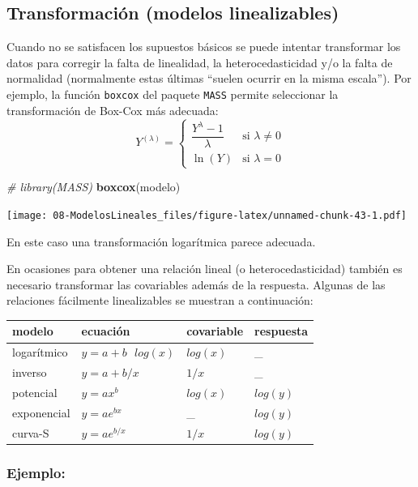 \documentclass[]{book}
\newenvironment{Shaded}{\begin{snugshade}}{\end{snugshade}}
\newcommand{\KeywordTok}[1]{\textcolor[rgb]{0.13,0.29,0.53}{\textbf{#1}}}
\newcommand{\CommentTok}[1]{\textcolor[rgb]{0.56,0.35,0.01}{\textit{#1}}}
\newcommand{\NormalTok}[1]{#1}
\begin{document}
\subsection{Transformación (modelos
linealizables)}\label{transformacion-modelos-linealizables}

Cuando no se satisfacen los supuestos básicos se puede intentar
transformar los datos para corregir la falta de linealidad, la
heterocedasticidad y/o la falta de normalidad (normalmente estas últimas
``suelen ocurrir en la misma escala''). Por ejemplo, la función
\texttt{boxcox} del paquete \texttt{MASS} permite seleccionar la
transformación de Box-Cox más adecuada: \[Y^{(\lambda)} =
\begin{cases}
\dfrac{Y^\lambda - 1}{\lambda} & \text{si } \lambda \neq 0 \\
\ln{(Y)} & \text{si } \lambda = 0
\end{cases}\]

\begin{Shaded}
\begin{Highlighting}[]
\CommentTok{# library(MASS)}
\KeywordTok{boxcox}\NormalTok{(modelo)}
\end{Highlighting}
\end{Shaded}

\texttt{[image: 08-ModelosLineales\_files/figure-latex/unnamed-chunk-43-1.pdf]}

En este caso una transformación logarítmica parece adecuada.

En ocasiones para obtener una relación lineal (o heterocedasticidad)
también es necesario transformar las covariables además de la respuesta.
Algunas de las relaciones fácilmente linealizables se muestran a
continuación:

\begin{longtable}[]{@{}llll@{}}
\toprule
modelo & ecuación & covariable & respuesta\tabularnewline
\midrule
\endhead
logarítmico & \(y = a + b\text{ }log(x)\) & \(log(x)\) &
\_\tabularnewline
inverso & \(y = a + b/x\) & \(1/x\) & \_\tabularnewline
potencial & \(y = ax^b\) & \(log(x)\) & \(log(y)\)\tabularnewline
exponencial & \(y = ae^{bx}\) & \_ & \(log(y)\)\tabularnewline
curva-S & \(y = ae^{b/x}\) & \(1/x\) & \(log(y)\)\tabularnewline
\bottomrule
\end{longtable}

\subsubsection{Ejemplo:}\label{ejemplo-1}
\end{document}
